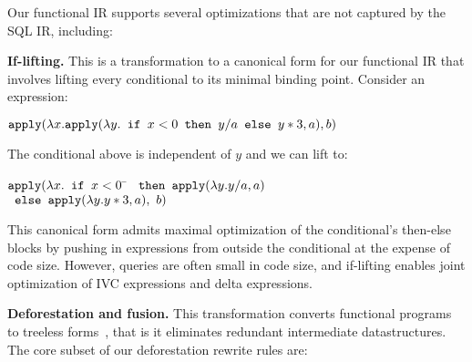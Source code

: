 Our functional IR supports several optimizations that are not captured by the
SQL IR, including:

\vspace{1mm}
\noindent\textbf{If-lifting.} This is a transformation to a canonical form
for our functional IR that involves lifting every conditional to its minimal
binding point. Consider an expression:

$\mbox{\texttt{apply}}(\lambda x. \mbox{\texttt{apply}}(\lambda y.
  \mbox{\texttt{ if }} x < 0 \mbox{\texttt{ then }} y/a
                             \mbox{\texttt{ else }} y*3, a), b)$

\vspace{1mm}
\noindent The conditional above is independent of $y$ and we can lift to:

\vspace{-2mm}
\begin{tabbing}
$\mbox{\texttt{apply}}(\lambda x.
  \mbox{\texttt{ if }} x < 0$ \= $\mbox{\texttt{ then }}
    \mbox{\texttt{apply}}(\lambda y. y/a, a)$\\
\> $\mbox{\texttt{ else }} \mbox{\texttt{apply}}(\lambda y. y*3, a),\ b)$
\end{tabbing}


\vspace{-2mm}  
\noindent This canonical form admits maximal optimization of the conditional's
then-else blocks by pushing in expressions from outside the conditional
at the expense of code size. However, queries are often small
in code size, and if-lifting enables joint optimization of IVC expressions and
delta expressions.


\vspace{1mm}
\noindent\textbf{Deforestation and fusion.} This transformation converts
functional programs to treeless forms~\cite{marlow-fp:92}, that is it eliminates
redundant intermediate datastructures. The core subset of our deforestation
rewrite rules are:

\def\xform{\mbox{\texttt{:-}}}
\def\fst{\mbox{\texttt{fst}}}

